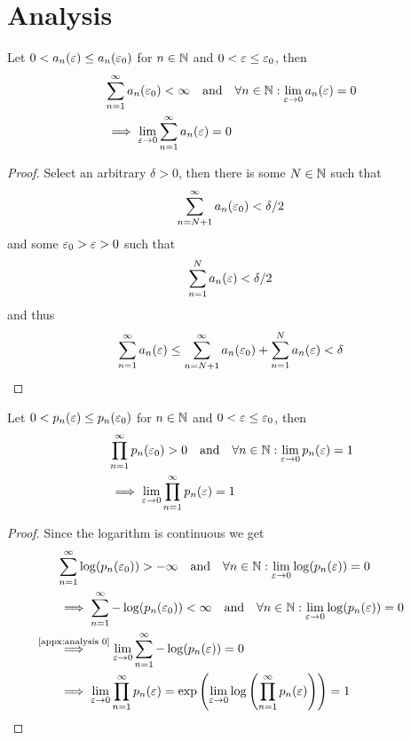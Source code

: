 \section{Analysis}
\begin{lemma}\label{appx:analysis 0}
    Let \(0<a_n(\varepsilon)\le a_n(\varepsilon_0)\) for \(n\in\mathbb{N}\) and  \(0<\varepsilon\le \varepsilon_0\), then
    \begin{align*}
        &\sum_{n=1}^\infty a_n(\varepsilon_0) < \infty 
        \quad\text{and}\quad \forall n\in\mathbb{N}: \lim_{\varepsilon\to 0} a_n(\varepsilon)= 0 \\
        &\implies \lim_{\varepsilon\to 0}\sum_{n=1}^\infty a_n(\varepsilon)=0
    \end{align*}
\end{lemma}
\begin{proof}
    Select an arbitrary \(\delta>0\), then there is some \(N\in\mathbb{N}\) such that
    \[
        \sum_{n=N+1}^\infty a_n(\varepsilon_0) < \delta/2
    \]
    and some \(\varepsilon_0>\varepsilon>0\) such that
    \[
        \sum_{n=1}^N a_n(\varepsilon)<\delta/2
    \]
    and thus
    \[
        \sum_{n=1}^\infty a_n(\varepsilon)
        \le \sum_{n=N+1}^\infty a_n(\varepsilon_0) +\sum_{n=1}^N a_n(\varepsilon)<\delta \qedhere
    \]
\end{proof}
\begin{lemma}\label{appx:analysis 1}
    Let \(0<p_n(\varepsilon)\le p_n(\varepsilon_0)\) for \(n\in\mathbb{N}\) and \(0<\varepsilon \le \varepsilon_0\), then
    \begin{align*}
        &\prod_{n=1}^\infty p_n(\varepsilon_0) > 0 
        \quad\text{and}\quad \forall n\in\mathbb{N}: \lim_{\varepsilon\to 0} p_n(\varepsilon)= 1 \\
        &\implies \lim_{\varepsilon\to 0}\prod_{n=1}^\infty p_n(\varepsilon)=1
    \end{align*}
\end{lemma}
\begin{proof}
    Since the logarithm is continuous we get
    \begin{align*}
        &\sum_{n=1}^\infty \log(p_n(\vep_0))>-\infty \quad \text{and}\quad \forall n\in\N: \lim_{\vep\to 0} \log(p_n(\vep))= 0\\
        &\implies \sum_{n=1}^\infty -\log(p_n(\vep_0))<\infty \quad \text{and}\quad \forall n\in\N: \lim_{\vep\to 0} \log(p_n(\vep))= 0\\
        &\lximplies{\text{\ref{appx:analysis 0}}} \lim_{\vep\to 0} 
        \sum_{n=1}^\infty -\log(p_n(\vep)) =0\\
        &\implies \lim_{\vep\to 0}\prod_{n=1}^\infty p_n(\vep)=\exp\left( 
            \lim_{\vep\to 0}\log\left( \prod_{n=1}^\infty p_n(\vep) \right)
        \right)=1\qedhere
    \end{align*}
\end{proof}
\endinput
